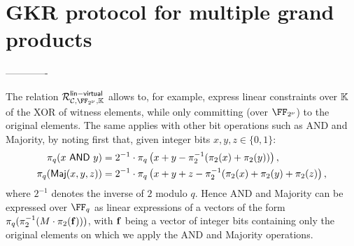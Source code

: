 \documentclass[11pt,letterpaper,usenames,dvipsnames]{article}
\begin{document}
\section{GKR protocol for multiple grand products}


-------------




 The relation $\Relation_{\cC, \comfield, \evalfield}^{\mathsf{lin-virtual}}$  allows to, for example, express linear constraints over $\mathbb{K}$ of the XOR of witness elements, while only committing (over $\comfield$) to the original elements. The same applies with other bit operations such as AND and Majority, by noting first that, given integer bits $x,y,z\in \{0,1\}$:  
%
\begin{equation*}
    \begin{aligned}
        \pi_q(x \ \mathsf{AND}\  y) & = 2^{-1}\cdot \pi_q \left( x+y - \pi_2^{-1}(\pi_2(x) + \pi_2(y)) \right),\\
        \pi_q(\mathsf{Maj}(x,y,z)) &= 2^{-1}\cdot \pi_q \left( x+y+z - \pi_2^{-1}(\pi_2(x) + \pi_2(y) + \pi_2(z) \right),
    \end{aligned}
\end{equation*}
where $2^{-1}$ denotes the inverse of $2$ modulo $q$.  
%
Hence AND and Majority can be expressed over $\FF_q$ as  linear expressions of a vectors of the form $\pi_q(\pi_2^{-1}(M\cdot \pi_2(\mathbf{f})))$, with $\mathbf{f}$ being a vector of integer bits containing only the original elements on which we apply the AND and Majority operations. 


\bigskip
\end{document}
